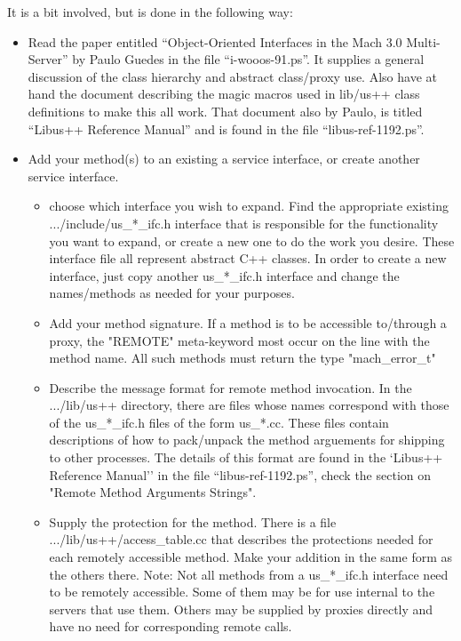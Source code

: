 It is a bit involved, but is done in the following way:
\begin{itemize}
\item Read the paper entitled
``Object-Oriented Interfaces in the Mach 3.0 Multi-Server''
by Paulo Guedes in the file
``i-wooos-91.ps''.
It supplies a general
discussion of the class hierarchy and abstract class/proxy use.
Also have at hand the document describing the magic macros used in
lib/us++ class definitions to make this all work.  That document also
by Paulo, is titled ``Libus++ Reference Manual'' and is found in the
file ``libus-ref-1192.ps''.

\item Add your method(s) to an existing a service interface, or create
another service interface.
\begin{itemize}
\item choose which interface you wish to expand.  Find the appropriate existing
.../include/us\_*\_ifc.h interface that is responsible for the functionality
you want to expand, or create a new one to do the work you desire.
These interface file all represent abstract C++ classes.  In order to
create a new interface, just copy another us\_*\_ifc.h interface and change the
names/methods as needed for your purposes.

\item Add your method signature.  If a method is to be accessible to/through
a proxy, the "REMOTE" meta-keyword most occur on the line with the
method name.  All such methods must return the type "mach\_error\_t" 


\item Describe the message format for remote method invocation.  In the 
.../lib/us++ directory, there are files whose names correspond with those
of the us\_*\_ifc.h files of the form us\_*.cc.  These files contain descriptions
of how to pack/unpack the  method arguements for shipping
to other processes.  The details of this format are found in the
`Libus++ Reference Manual'' in the
file ``libus-ref-1192.ps'', check the section on
"Remote Method Arguments Strings".

\item Supply the protection for the method.  There is a file 
.../lib/us++/access\_table.cc
that describes the protections needed for each remotely 
accessible method.  Make your addition in the same form as the others there.
Note:  Not all methods from a us\_*\_ifc.h interface need to be remotely
accessible.  Some of them may be for use internal to the servers that
use them.  Others may be supplied by proxies directly and have no need
for corresponding remote calls.


\end{itemize}
\end{itemize}
